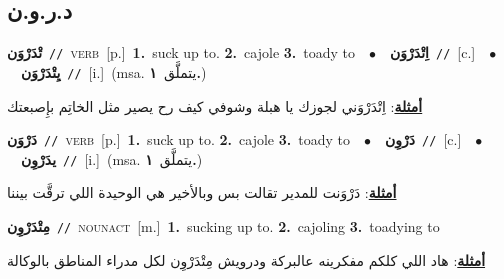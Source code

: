 \documentclass[10pt,a4paper,twoside]{article} %
\begin{document}
\begin{multicols}{2}
\vspace{-3mm}
\subsection*{\color{blue}\foreignlanguage{arabic}{د.ر.و.ن}\color{blue}{}} 

{\setlength\topsep{0pt}\textbf{\foreignlanguage{arabic}{تْدَرْوَن}}\ {\color{gray}\texttt{//}\color{black}}\ \textsc{verb}\ [p.]\ \textbf{1.}~suck up to.  \textbf{2.}~cajole  \textbf{3.}~toady to\ \ $\bullet$\ \ \setlength\topsep{0pt}\textbf{\foreignlanguage{arabic}{اِتْدَرْوَن}}\ {\color{gray}\texttt{//}\color{black}}\ [c.]\ \ $\bullet$\ \ \setlength\topsep{0pt}\textbf{\foreignlanguage{arabic}{يِتْدَرْوَن}}\ {\color{gray}\texttt{//}\color{black}}\ [i.]\ \color{gray}(msa. \foreignlanguage{arabic}{يتملَّق}~\foreignlanguage{arabic}{\textbf{١.}})\color{black}\  \begin{flushright}\color{gray}\foreignlanguage{arabic}{\textbf{\underline{\foreignlanguage{arabic}{أمثلة}}}: اِتْدَرْوَني لجوزك يا هبلة وشوفي كيف رح يصير مثل الخاتِم بإِصبعتك}\end{flushright}\color{black}} \vspace{2mm}

{\setlength\topsep{0pt}\textbf{\foreignlanguage{arabic}{دَرْوَن}}\ {\color{gray}\texttt{//}\color{black}}\ \textsc{verb}\ [p.]\ \textbf{1.}~suck up to.  \textbf{2.}~cajole  \textbf{3.}~toady to\ \ $\bullet$\ \ \setlength\topsep{0pt}\textbf{\foreignlanguage{arabic}{دَرْوِن}}\ {\color{gray}\texttt{//}\color{black}}\ [c.]\ \ $\bullet$\ \ \setlength\topsep{0pt}\textbf{\foreignlanguage{arabic}{يدَرْوِن}}\ {\color{gray}\texttt{//}\color{black}}\ [i.]\ \color{gray}(msa. \foreignlanguage{arabic}{يتملَّق}~\foreignlanguage{arabic}{\textbf{١.}})\color{black}\  \begin{flushright}\color{gray}\foreignlanguage{arabic}{\textbf{\underline{\foreignlanguage{arabic}{أمثلة}}}: دَرْوَنت للمدير تقالت بس وبالأخير هي الوحيدة اللي ترقَّت بيننا}\end{flushright}\color{black}} \vspace{2mm}

{\setlength\topsep{0pt}\textbf{\foreignlanguage{arabic}{مِتْدَرْوِن}}\ {\color{gray}\texttt{//}\color{black}}\ \textsc{noun\textunderscore act}\ [m.]\ \textbf{1.}~sucking up to.  \textbf{2.}~cajoling  \textbf{3.}~toadying to\  \begin{flushright}\color{gray}\foreignlanguage{arabic}{\textbf{\underline{\foreignlanguage{arabic}{أمثلة}}}: هاد اللي كلكم مفكرينه عالبركة ودرويش مِتْدَرْوِن لكل مدراء المناطق بالوكالة}\end{flushright}\color{black}} \vspace{2mm}


\end{multicols}
\end{document}
